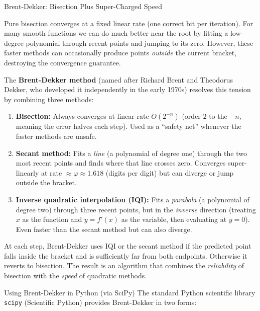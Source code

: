 \documentclass[aspectratio=169,10pt]{beamer}
\begin{document}
\begin{frame}[allowframebreaks]{Brent-Dekker: Bisection Plus Super-Charged Speed}

  Pure bisection converges at a fixed linear rate (one correct bit per
  iteration).  For many smooth functions we can do much better near the root
  by fitting a low-degree polynomial through recent points and jumping to
  its zero.  However, these faster methods can occasionally produce points
  \emph{outside} the current bracket, destroying the convergence guarantee.

  The \textbf{Brent-Dekker method} (named after Richard Brent and Theodorus
  Dekker, who developed it independently in the early 1970s) resolves this
  tension by combining three methods:

  \begin{enumerate}
    \item \textbf{Bisection:} Always converges at linear rate $O(2^{-n})$
          (order $2$ to the $-n$, meaning the error halves each step).
          Used as a ``safety net'' whenever the faster methods are unsafe.
    \item \textbf{Secant method:} Fits a \emph{line} (a polynomial of degree
          one) through the two most recent points and finds where that line
          crosses zero.  Converges super-linearly at rate $\approx \varphi
          \approx 1.618$ (digits per digit) but can diverge or jump outside
          the bracket.
    \item \textbf{Inverse quadratic interpolation (IQI):} Fits a
          \emph{parabola} (a polynomial of degree two) through three recent
          points, but in the \emph{inverse} direction (treating $x$ as the
          function and $y = f'(x)$ as the variable, then evaluating at $y = 0$).
          Even faster than the secant method but can also diverge.
  \end{enumerate}

  At each step, Brent-Dekker uses IQI or the secant method if the predicted
  point falls inside the bracket and is sufficiently far from both endpoints.
  Otherwise it reverts to bisection.  The result is an algorithm that
  combines the \emph{reliability} of bisection with the \emph{speed} of
  quadratic methods.

  \begin{block}{Using Brent-Dekker in Python (via SciPy)}
    The standard Python scientific library \texttt{scipy} (Scientific Python)
    provides Brent-Dekker in two forms:


\end{block}
\end{frame}
\end{document}
